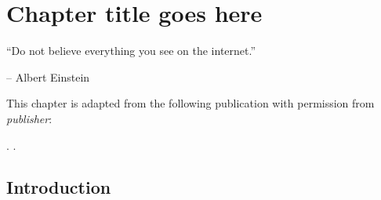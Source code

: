 \chapter{Chapter title goes here} \label{chap:chap-2}



\epigraph{\enquote{Do not believe everything you see on the internet.}}{-- Albert Einstein}



This chapter is adapted from the following publication with permission from \emph{publisher}: 
\begin{spacing}{\FullCiteSpacing}
    . .
\end{spacing}


\section{Introduction}
\Blindtext[3]


